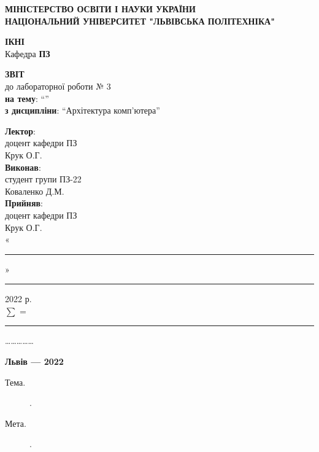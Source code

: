 \documentclass{article}
\newcommand\subject{Архітектура комп'ютера}
\newcommand\lecturer{доцент кафедри ПЗ\\Крук О.Г.}
\newcommand\teacher{доцент кафедри ПЗ\\Крук О.Г.}
\newcommand\mygroup{ПЗ-22}
\newcommand\lab{3}
\newcommand\theme{}
\newcommand\purpose{}
\begin{document}
\begin{normalsize}
	\begin{titlepage}
		\thispagestyle{empty}
		\begin{center}
			\textbf{МІНІСТЕРСТВО ОСВІТИ І НАУКИ УКРАЇНИ\\
				НАЦІОНАЛЬНИЙ УНІВЕРСИТЕТ "ЛЬВІВСЬКА ПОЛІТЕХНІКА"}
		\end{center}
		\begin{flushright}
			\textbf{ІКНІ}\\
			Кафедра \textbf{ПЗ}
		\end{flushright}
		\vspace{200pt}
		\begin{center}
			\textbf{ЗВІТ}\\
			\vspace{10pt}
			до лабораторної роботи № \lab\\
			\textbf{на тему}: “\textit{\theme}”\\
			\textbf{з дисципліни}: “\subject”
		\end{center}
		\vspace{112pt}
		\begin{flushright}
			
			\textbf{Лектор}:\\
			\lecturer\\
			\vspace{28pt}
			\textbf{Виконав}:\\
			
			студент групи \mygroup\\
			Коваленко Д.М.\\
			\vspace{28pt}
			\textbf{Прийняв}:\\
			
			\teacher\\
			
			\vspace{28pt}
			«\rule{1cm}{0.15mm}» \rule{1.5cm}{0.15mm} 2022 р.\\
			$\sum$ = \rule{1cm}{0.15mm}……………\\
			
		\end{flushright}
		\vspace{\fill}
		\begin{center}
			\textbf{Львів — 2022}
		\end{center}
	\end{titlepage}
		
	\begin{description}
		\item[Тема.] \theme.
		\item[Мета.] \purpose.
	\end{description}


\end{normalsize}
\end{document}

